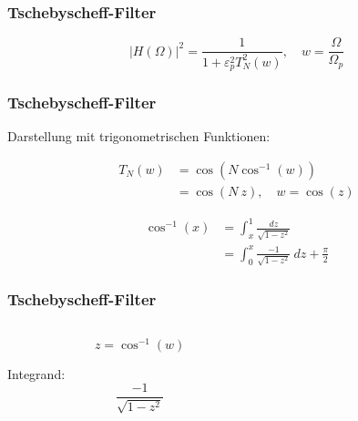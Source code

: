 \documentclass[ngerman, aspectratio=169, xcolor={rgb}]{beamer}
\begin{document}
	\begin{frame}
		\frametitle{Tschebyscheff-Filter}

		\begin{equation*}
			| H(\Omega)|^2 = \frac{1}{1 + \varepsilon_p^2 T_N^2(w)}, \quad w=\frac{\Omega}{\Omega_p}
		\end{equation*}

		\begin{center}
			\scalebox{0.9}{
				
			}
		\end{center}

	\end{frame}


	\begin{frame}
		\frametitle{Tschebyscheff-Filter}

		Darstellung mit trigonometrischen Funktionen:

		\begin{align*}
			T_N(w) &= \cos \left( N \cos^{-1}(w) \right) \\
				&= \cos \left(N~z \right), \quad w= \cos(z)
		\end{align*}

		\pause

		\begin{align*}
			\cos^{-1}(x)
			&=
			\int_{x}^{1}
			\frac{
				dz
			}{
				\sqrt{
					1-z^2
				}
			}\\
			&=
			\int_{0}^{x}
			\frac{
				-1
			}{
				\sqrt{
					1-z^2
				}
			}
			~dz
			+ \frac{\pi}{2}
		\end{align*}


	\end{frame}

	\begin{frame}
		\frametitle{Tschebyscheff-Filter}

		\begin{columns}

			\begin{column}{0.2\textwidth}

				\begin{equation*}
					z = \cos^{-1}(w)
				\end{equation*}

				\vspace{0.5cm}

				Integrand:
				\begin{equation*}
					\frac{
						-1
					}{
						\sqrt{
							1-z^2
						}
					}
				\end{equation*}

			\end{column}
			\begin{column}{0.8\textwidth}


				\begin{center}
					\scalebox{0.7}{
						
					}
				\end{center}

			\end{column}
		\end{columns}



	\end{frame}
\end{document}
